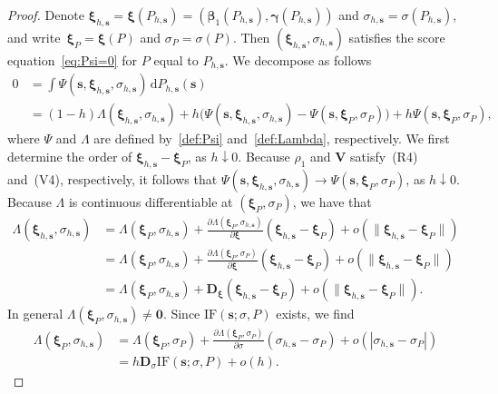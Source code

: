 \documentclass{article}
\numberwithin{equation}{section}
\theoremstyle{plain}
\newcommand{\dd}{\mathrm{d}}
\newcommand{\bbeta}{\bm\beta}
\newcommand{\bxi}{\bm\xi}
\newcommand{\bgamma}{\bm\gamma}
\newcommand{\bs}{\mathbf{s}}
\newcommand{\bV}{\mathbf{V}}
\newcommand{\bD}{\mathbf{D}}
\begin{document}
\begin{proof}
Denote $\bxi_{h,\bs}=\bxi(P_{h,\bs})=(\bbeta_1(P_{h,\bs}),\bgamma(P_{h,\bs}))$
and $\sigma_{h,\bs}=\sigma(P_{h,\bs})$,
and write~$\bxi_P=\bxi(P)$ and $\sigma_P=\sigma(P)$.
Then $(\bxi_{h,\bs},\sigma_{h,\bs})$ satisfies the score equation~\eqref{eq:Psi=0} for $P$ equal to $P_{h,\bs}$.
We decompose as follows
\begin{equation}
\label{eq:decomposition IF}
\begin{split}
0
&=
\int \Psi(\bs,\bxi_{h,\bs},\sigma_{h,\bs})\,\dd P_{h,\bs}(\bs)\\
&=
(1-h)
\Lambda(\bxi_{h,\bs},\sigma_{h,\bs})
+
h\Big(
\Psi(\bs,\bxi_{h,\bs},\sigma_{h,\bs})-\Psi(\bs,\bxi_P,\sigma_P)
\Big)
+
h\Psi(\bs,\bxi_P,\sigma_P),
\end{split}
\end{equation}
where $\Psi$ and $\Lambda$ are defined by~\eqref{def:Psi} and~\eqref{def:Lambda}, respectively.
We first determine the order of $\bxi_{h,\bs}-\bxi_P$, as $h\downarrow0$.
Because $\rho_1$ and $\bV$ satisfy~(R4) and~(V4), respectively, it follows that
$\Psi(\bs,\bxi_{h,\bs},\sigma_{h,\bs})\to\Psi(\bs,\bxi_P,\sigma_P)$, as $h\downarrow0$.
Because $\Lambda$ is continuous differentiable at $(\bxi_P,\sigma_P)$,
we have that
\begin{equation}
\label{eq:term1}
\begin{split}
\Lambda(\bxi_{h,\bs},\sigma_{h,\bs})
&=
\Lambda(\bxi_P,\sigma_{h,\bs})
+
\frac{\partial\Lambda(\bxi_P,\sigma_{h,\bs})}{\partial\bxi}
(\bxi_{h,\bs}-\bxi_P)
+
o(\|\bxi_{h,\bs}-\bxi_P\|)\\
&=
\Lambda(\bxi_P,\sigma_{h,\bs})
+
\frac{\partial\Lambda(\bxi_P,\sigma_P)}{\partial\bxi}
(\bxi_{h,\bs}-\bxi_P)
+
o(\|\bxi_{h,\bs}-\bxi_P\|)\\
&=
\Lambda(\bxi_P,\sigma_{h,\bs})
+
\bD_{\bxi}
(\bxi_{h,\bs}-\bxi_P)
+
o(\|\bxi_{h,\bs}-\bxi_P\|).
\end{split}
\end{equation}
In general $\Lambda(\bxi_P,\sigma_{h,\bs})\ne \mathbf{0}$.
Since $\text{IF}(\bs;\sigma,P)$ exists, we find
\begin{equation}
\label{eq:term2}
\begin{split}
\Lambda(\bxi_P,\sigma_{h,\bs})
&=
\Lambda(\bxi_P,\sigma_P)
+
\frac{\partial\Lambda(\bxi_P,\sigma_P)}{\partial\sigma}(\sigma_{h,\bs}-\sigma_P)
+
o(|\sigma_{h,\bs}-\sigma_P|)\\
&=
h
\bD_{\sigma}
\text{IF}(\bs;\sigma,P)
+
o(h).
\end{split}

\end{equation}
\end{proof}
\end{document}
